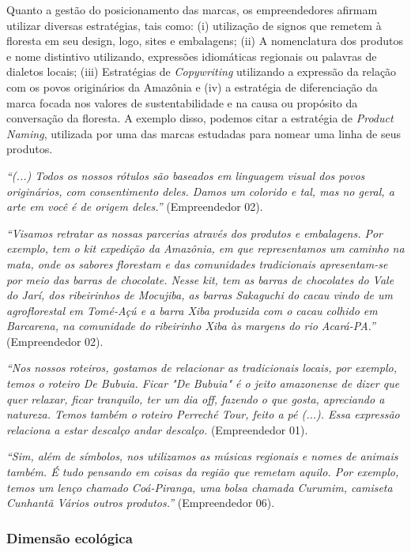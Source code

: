 Quanto a gestão do posicionamento das marcas, os empreendedores afirmam utilizar diversas estratégias, tais como: (i) utilização de signos que remetem à floresta em seu design, logo, sites e embalagens; (ii) A nomenclatura dos produtos e nome distintivo utilizando, expressões idiomáticas regionais ou palavras de dialetos locais; (iii) Estratégias de \textit{Copywriting} utilizando a expressão da relação com os povos originários da Amazônia e (iv) a estratégia de diferenciação da marca focada nos valores de sustentabilidade e na causa ou propósito da conversação da floresta. A exemplo disso, podemos citar a estratégia de \textit{Product Naming}, utilizada por uma das marcas estudadas para nomear uma linha de seus produtos.

\textit{“(...) Todos os nossos rótulos são baseados em linguagem visual dos povos originários, com consentimento deles. Damos um colorido e tal, mas no geral, a arte em você é de origem deles.”} (Empreendedor 02).

\textit{“Visamos retratar as nossas parcerias através dos produtos e embalagens. Por exemplo, tem o kit expedição da Amazônia, em que representamos um caminho na mata, onde os sabores florestam e das comunidades tradicionais apresentam-se por meio das barras de chocolate. Nesse kit, tem as barras de chocolates do Vale do Jarí, dos ribeirinhos de Mocujiba, as barras Sakaguchi do cacau vindo de um agroflorestal em Tomé-Açú e a barra Xiba produzida com o cacau colhido em Barcarena, na comunidade do ribeirinho Xiba às margens do rio Acará-PA.”}  (Empreendedor 02).

\textit{“Nos nossos roteiros, gostamos de relacionar as tradicionais locais, por exemplo, temos o roteiro De Bubuia. Ficar "De Bubuia" é o jeito amazonense de dizer que quer relaxar, ficar tranquilo, ter um dia off, fazendo o que gosta, apreciando a natureza. Temos também o roteiro Perreché Tour, feito a pé (...). Essa expressão relaciona a estar descalço andar descalço.} (Empreendedor 01).

\textit{“Sim, além de símbolos, nos utilizamos as músicas regionais e nomes de animais também. É tudo pensando em coisas da região que remetam aquilo. Por exemplo, temos um lenço chamado Coá-Piranga, uma bolsa chamada Curumim, camiseta Cunhantã Vários outros produtos.”} (Empreendedor 06).

\subsubsection*{Dimensão ecológica}

